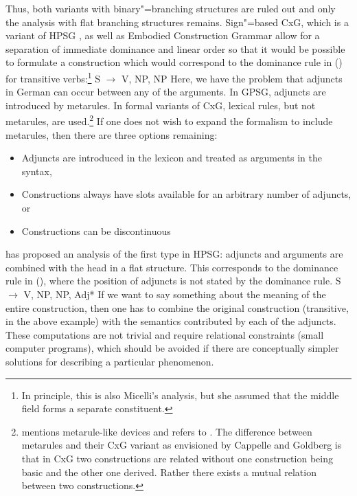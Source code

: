 \largerpage
Thus, both variants with binary"=branching structures are ruled out and only the analysis with flat branching structures remains.
Sign"=based CxG, which is a variant of HPSG \citep[]{Sag2010b}, as well as Embodied Construction Grammar \citep[]{BC2005a} allow for
a separation of immediate dominance and linear order so that it would be possible to
formulate a construction which would correspond to the dominance rule in () for transitive verbs:\footnote{%
	In principle, this is also Micelli's analysis, but she assumed that the middle field forms a separate constituent.%
}
\ea
S $\to$ V, NP, NP
\z
Here, we have the problem that adjuncts in German can occur between any of the arguments. In GPSG, adjuncts are introduced by metarules.
In formal variants of CxG, lexical rules, but not metarules, are used.\footnote{\label{fn-allostructions}%
  \citet[]{Goldberg2014a} mentions metarule-like devices and refers to
  . The difference between metarules and their CxG variant as envisioned by
  Cappelle and Goldberg is that in CxG two
  constructions are related without one construction being basic and the other one derived. Rather
  there exists a mutual relation between two constructions.%
} If one does not wish to expand the formalism to include metarules,
then there are three options remaining:
\begin{itemize}
\item Adjuncts are introduced in the lexicon \citep*{NB94,BMS2001a} and treated as arguments in the syntax,
\item Constructions always have slots available for an arbitrary number of adjuncts, or
\item Constructions can be discontinuous
\end{itemize}

\noindent
\citet{Kasper94a} has proposed an analysis of the first type in HPSG: adjuncts and arguments are combined with the head in a flat structure.
This corresponds to the dominance rule in (), where the position of adjuncts is not stated by the dominance rule.
\ea
S $\to$ V, NP, NP, Adj*
\z
If we want to say something about the meaning of the entire construction, then one has to combine the original construction (transitive, in the above example)
with the semantics contributed by each of the adjuncts. These computations are not trivial and require relational constraints (small computer programs), which
should be avoided if there are conceptually simpler solutions for describing a particular phenomenon.

